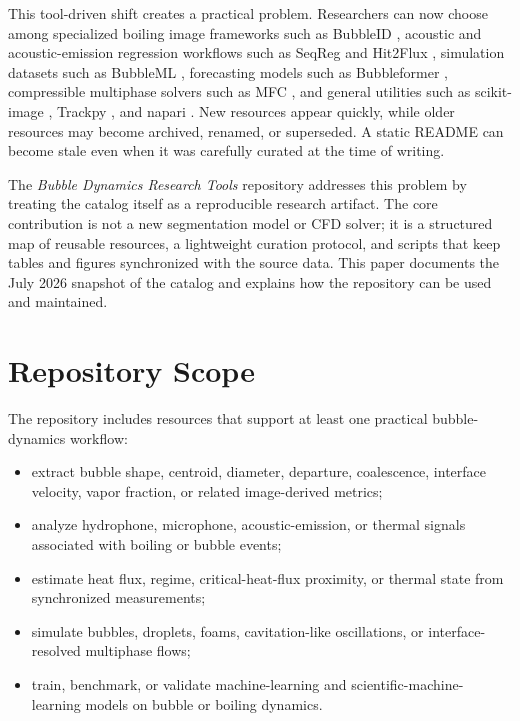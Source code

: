 \documentclass[11pt]{article}
\begin{document}
This tool-driven shift creates a practical problem. Researchers can now choose among specialized boiling image frameworks such as BubbleID \cite{dunlap2024bubbleid}, acoustic and acoustic-emission regression workflows such as SeqReg and Hit2Flux \cite{dunlap2023acoustic,dunlap2025hit2flux}, simulation datasets such as BubbleML \cite{hassan2023bubbleml}, forecasting models such as Bubbleformer \cite{hassan2025bubbleformer}, compressible multiphase solvers such as MFC \cite{wilfong2026mfc}, and general utilities such as scikit-image \cite{vanderwalt2014scikitimage}, Trackpy \cite{allan2024trackpy}, and napari \cite{sofroniew2024napari}. New resources appear quickly, while older resources may become archived, renamed, or superseded. A static README can become stale even when it was carefully curated at the time of writing.

The \emph{Bubble Dynamics Research Tools} repository addresses this problem by treating the catalog itself as a reproducible research artifact. The core contribution is not a new segmentation model or CFD solver; it is a structured map of reusable resources, a lightweight curation protocol, and scripts that keep tables and figures synchronized with the source data. This paper documents the July 2026 snapshot of the catalog and explains how the repository can be used and maintained.

\section{Repository Scope}

The repository includes resources that support at least one practical bubble-dynamics workflow:
\begin{itemize}
  \item extract bubble shape, centroid, diameter, departure, coalescence, interface velocity, vapor fraction, or related image-derived metrics;
  \item analyze hydrophone, microphone, acoustic-emission, or thermal signals associated with boiling or bubble events;
  \item estimate heat flux, regime, critical-heat-flux proximity, or thermal state from synchronized measurements;
  \item simulate bubbles, droplets, foams, cavitation-like oscillations, or interface-resolved multiphase flows;
  \item train, benchmark, or validate machine-learning and scientific-machine-learning models on bubble or boiling dynamics.
\end{itemize}
\end{document}
